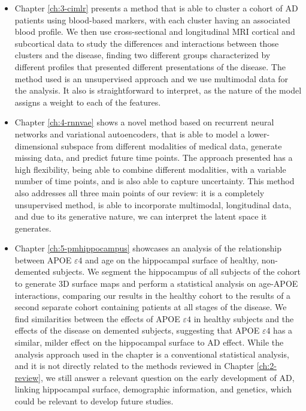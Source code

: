 \begin{itemize}
\item Chapter \ref{ch:3-cimlr} presents a method that is able to cluster a cohort of AD patients using blood-based markers, with each cluster having an associated blood profile. We then use cross-sectional and longitudinal MRI cortical and subcortical data to study the differences and interactions between those clusters and the disease, finding two different groups characterized by different profiles that presented different presentations of the disease. The method used is an unsupervised approach and we use multimodal data for the analysis. It also is straightforward to interpret, as the nature of the model assigns a weight to each of the features. 
\item Chapter \ref{ch:4-rnnvae} shows a novel method based on recurrent neural networks and variational autoencoders, that is able to model a lower-dimensional subspace from different modalities of medical data, generate missing data, and predict future time points. The approach presented has a high flexibility, being able to combine different modalities, with a variable number of time points, and is also able to capture uncertainty. This method also addresses all three main points of our review: it is a completely unsupervised method, is able to incorporate multimodal, longitudinal data, and due to its generative nature, we can interpret the latent space it generates.
\item Chapter \ref{ch:5-pmhippocampus} showcases an analysis of the relationship between APOE $\varepsilon4$ and age on the hippocampal surface of healthy, non-demented subjects. We segment the hippocampus of all subjects of the cohort to generate 3D surface maps and perform a statistical analysis on age-APOE interactions, comparing our results in the healthy cohort to the results of a second separate cohort containing patients at all stages of the disease. We find similarities between the effects of APOE $\varepsilon4$ in healthy subjects and the effects of the disease on demented subjects, suggesting that APOE $\varepsilon4$ has a similar, milder effect on the hippocampal surface to AD effect. While the analysis approach used in the chapter is a conventional statistical analysis, and it is not directly related to the methods reviewed in Chapter \ref{ch:2-review}, we still answer a relevant question on the early development of AD, linking hippocampal surface, demographic information, and genetics, which could be relevant to develop future studies.
\end{itemize}

